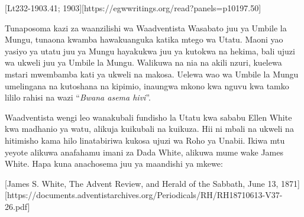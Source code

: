 [Lt232-1903.41; 1903][https://egwwritings.org/read?panels=p10197.50]


Tunaposoma kazi za waanzilishi wa Waadventista Wasabato juu ya Umbile la Mungu, tunaona kwamba hawakuanguka katika mtego wa Utatu. Maoni yao yasiyo ya utatu juu ya Mungu hayakukwa juu ya kutokwa na hekima, bali ujuzi wa ukweli juu ya Umbile la Mungu. Walikuwa na nia na akili nzuri, kuelewa mstari mwembamba kati ya ukweli na makosa. Uelewa wao wa Umbile la Mungu umelingana na kutoshana na kipimio, inaungwa mkono kwa nguvu kwa tamko lililo rahisi na wazi “\textit{Bwana asema hivi}”.




Waadventista wengi leo wanakubali fundisho la Utatu kwa sababu Ellen White kwa madhanio ya watu, alikuja kuikubali na kuikuza. Hii ni mbali na ukweli na hitimisho kama hilo linatabiriwa kukosa ujuzi wa Roho ya Unabii. Ikiwa mtu yeyote alikuwa anafahamu imani za Dada White, alikuwa mume wake James White. Hapa kuna anachosema juu ya maandishi ya mkewe:


[James S. White, The Advent Review, and Herald of the Sabbath, June 13, 1871][https://documents.adventistarchives.org/Periodicals/RH/RH18710613-V37-26.pdf]




